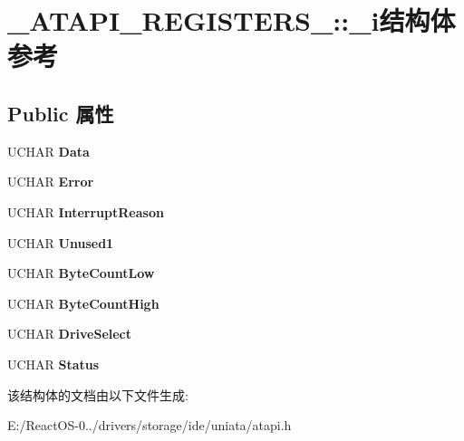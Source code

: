 \hypertarget{struct___a_t_a_p_i___r_e_g_i_s_t_e_r_s__1_1_1__i}{}\section{\+\_\+\+A\+T\+A\+P\+I\+\_\+\+R\+E\+G\+I\+S\+T\+E\+R\+S\+\_\+:\+:\+\_\+i结构体 参考}
\label{struct___a_t_a_p_i___r_e_g_i_s_t_e_r_s__1_1_1__i}
\subsection*{Public 属性}
\begin{DoxyCompactItemize}
\item 
\mbox{\label{struct___a_t_a_p_i___r_e_g_i_s_t_e_r_s__1_1_1__i_affa31da0a42c75a0dbd4d952bac2e392}} 
U\+C\+H\+AR {\bfseries Data}
\item 
\mbox{\label{struct___a_t_a_p_i___r_e_g_i_s_t_e_r_s__1_1_1__i_a66d744b98aee11936d70f9bce7a50889}} 
U\+C\+H\+AR {\bfseries Error}
\item 
\mbox{\label{struct___a_t_a_p_i___r_e_g_i_s_t_e_r_s__1_1_1__i_a946c54c5c8b3199d117608996afdcb5f}} 
U\+C\+H\+AR {\bfseries Interrupt\+Reason}
\item 
\mbox{\label{struct___a_t_a_p_i___r_e_g_i_s_t_e_r_s__1_1_1__i_a712728619b6cc328182d52dc2db87780}} 
U\+C\+H\+AR {\bfseries Unused1}
\item 
\mbox{\label{struct___a_t_a_p_i___r_e_g_i_s_t_e_r_s__1_1_1__i_a11b9b0aa853b25eefe6b672dc5422796}} 
U\+C\+H\+AR {\bfseries Byte\+Count\+Low}
\item 
\mbox{\label{struct___a_t_a_p_i___r_e_g_i_s_t_e_r_s__1_1_1__i_a21def73e44c000eb7dc7680fec64f923}} 
U\+C\+H\+AR {\bfseries Byte\+Count\+High}
\item 
\mbox{\label{struct___a_t_a_p_i___r_e_g_i_s_t_e_r_s__1_1_1__i_ad24a2efb8ee2dc147a79fcecff0f8bb7}} 
U\+C\+H\+AR {\bfseries Drive\+Select}
\item 
\mbox{\label{struct___a_t_a_p_i___r_e_g_i_s_t_e_r_s__1_1_1__i_aaa043a4b4e2f1d6f6558e09e406ad91d}} 
U\+C\+H\+AR {\bfseries Status}
\end{DoxyCompactItemize}


该结构体的文档由以下文件生成\+:\begin{DoxyCompactItemize}
\item 
E\+:/\+React\+O\+S-\/0../drivers/storage/ide/uniata/atapi.\+h\end{DoxyCompactItemize}

